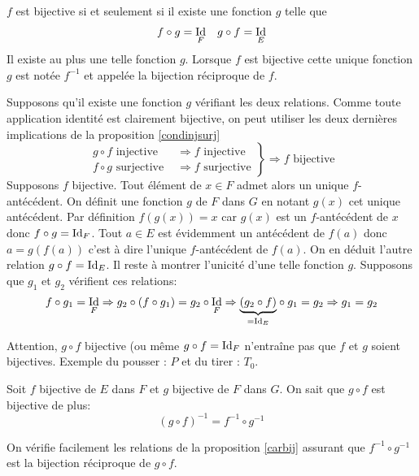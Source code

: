 \begin{propn}\label{carbij}
 $f$ est bijective si et seulement si il existe une fonction $g$ telle que
\begin{align*}
 f\circ g =\mathop{\mathrm{Id}} _F & & g\circ f = \mathop{\mathrm{Id}} _E
\end{align*}
Il existe au plus une telle fonction $g$. Lorsque $f$ est bijective cette unique fonction $g$ est notée $f^{-1}$ et appelée la bijection réciproque de $f$.
\end{propn}
\begin{demo}
Supposons qu'il existe une fonction $g$ vérifiant les deux relations. Comme toute application identité est clairement bijective, on peut utiliser les deux dernières implications de la proposition \ref{condinjsurj}
\begin{displaymath}
\left. 
\begin{aligned}
 g\circ f \text{ injective }&\Rightarrow f \text{ injective}  \\ f\circ g \text{ surjective } &\Rightarrow f \text{ surjective} 
\end{aligned}
\right\rbrace 
 \Rightarrow f \text{ bijective}
\end{displaymath}
Supposons $f$ bijective. Tout élément de $x\in F$ admet alors un unique $f$-antécédent. On définit une fonction $g$ de $F$ dans $G$ en notant $g(x)$ cet unique antécédent.\newline
Par définition $f(g(x))=x$ car $g(x)$ est un $f$-antécédent de $x$ donc $f\circ g = \mathop{\mathrm{Id}}_F$. \newline
Tout $a\in E$ est évidemment un antécédent de $f(a)$ donc $a=g(f(a))$ c'est à dire l'unique $f$-antécédent de $f(a)$. On en déduit l'autre relation $g \circ f  = \mathop{\mathrm{Id}}_E$.\newline
Il reste à montrer l'unicité d'une telle fonction $g$. Supposons que $g_1$ et $g_2$ vérifient ces relations:
\begin{displaymath}
  f\circ g_1 = \mathop{\mathrm{Id}}_F \Rightarrow g_2\circ \left(f\circ g_1\right)  = g_2\circ\mathop{\mathrm{Id}}_F \Rightarrow
\underset{= \mathop{\mathrm{Id}}_E}{\underbrace{\left(g_2\circ f\right)}}\circ g_1  = g_2  \Rightarrow g_1 = g_2
\end{displaymath}
\end{demo}
\begin{rem}
 Attention, $g\circ f$ bijective (ou même $g\circ f = \mathop{\mathrm{Id}}_F$ n'entraîne pas que $f$ et $g$ soient bijectives. Exemple du \og pousser \fg : $P$ et du \og tirer \fg : $T_0$.
\end{rem}

\begin{propn}
  Soit $f$ bijective de $E$ dans $F$ et $g$ bijective de $F$ dans $G$. On sait que $g\circ f$ est bijective de plus:
  \begin{displaymath}
    (g\circ f)^{-1} = f^{-1} \circ g^{-1}
  \end{displaymath}
\end{propn}
\begin{demo}
  On vérifie facilement les relations de la proposition \ref{carbij} assurant que $f^{-1} \circ g^{-1}$ est la bijection réciproque de $g\circ f$.
\end{demo}

